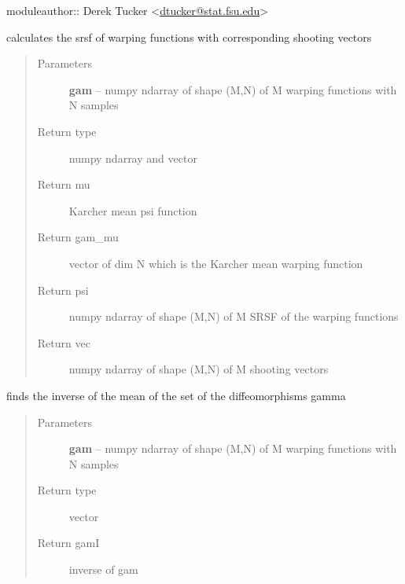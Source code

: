 \documentclass[letterpaper,10pt,english]{sphinxmanual}
\begin{document}
moduleauthor:: Derek Tucker \textless{}\href{mailto:dtucker@stat.fsu.edu}{dtucker@stat.fsu.edu}\textgreater{}

\begin{fulllineitems}
\label{utility_functions:utility_functions.SqrtMean}
calculates the srsf of warping functions with corresponding shooting vectors
\begin{quote}\begin{description}
\item[{Parameters}] \leavevmode
\textbf{gam} -- numpy ndarray of shape (M,N) of M warping functions
with N samples

\item[{Return type}]  numpy ndarray and vector

\item[{Return mu}] \leavevmode
Karcher mean psi function

\item[{Return gam\_mu}] \leavevmode
vector of dim N which is the Karcher mean warping function

\item[{Return psi}] \leavevmode
numpy ndarray of shape (M,N) of M SRSF of the warping functions

\item[{Return vec}] \leavevmode
numpy ndarray of shape (M,N) of M shooting vectors

\end{description}\end{quote}

\end{fulllineitems}


\begin{fulllineitems}
\label{utility_functions:utility_functions.SqrtMeanInverse}
finds the inverse of the mean of the set of the diffeomorphisms gamma
\begin{quote}\begin{description}
\item[{Parameters}] \leavevmode
\textbf{gam} -- numpy ndarray of shape (M,N) of M warping functions
with N samples

\item[{Return type}] \leavevmode
vector

\item[{Return gamI}] \leavevmode
inverse of gam

\end{description}\end{quote}

\end{fulllineitems}
\end{document}
